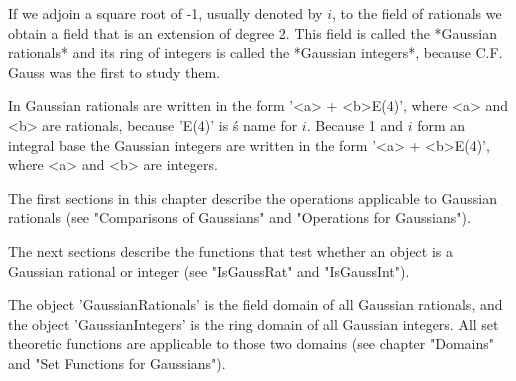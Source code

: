 %

If we adjoin a square root of -1, usually denoted by $i$, to the field of
rationals we obtain a field that is an extension of degree 2.  This field
is called the *Gaussian rationals* and its ring of integers is called the
*Gaussian integers*, because C.F. Gauss was the first to study them.

In {\GAP} Gaussian rationals are written in the  form '<a>  + <b>\*E(4)',
where <a> and  <b> are rationals,  because 'E(4)'  is {\GAP}\'s name  for
$i$.  Because 1 and $i$ form an integral base  the Gaussian  integers are
written in the form '<a> + <b>\*E(4)', where <a> and <b> are integers.

The first sections in this  chapter describe the operations applicable to
Gaussian rationals (see "Comparisons  of  Gaussians" and "Operations  for
Gaussians").

The next sections describe the functions that test whether an object is a
Gaussian rational or integer (see "IsGaussRat" and "IsGaussInt").

The {\GAP} object 'GaussianRationals' is the field domain of all Gaussian
rationals,  and the object 'GaussianIntegers'  is the ring domain of  all
Gaussian  integers.  All  set theoretic functions are applicable to those
two domains (see chapter "Domains" and "Set Functions for Gaussians").

